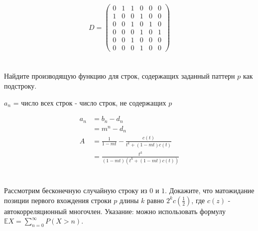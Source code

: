 \[D = \begin{pmatrix}
        0 & 1 & 1 & 0 & 0 & 0 \\
        1 & 0 & 0 & 1 & 0 & 0 \\
        0 & 0 & 1 & 0 & 1 & 0 \\
        0 & 0 & 0 & 1 & 0 & 1 \\
        0 & 0 & 1 & 0 & 0 & 0 \\
        0 & 0 & 0 & 1 & 0 & 0
    \end{pmatrix}\]

\section{}
Найдите производящую функцию для строк, содержащих заданный паттерн $p$ как подстроку.

\(a_n\) = число всех строк - число строк, не содержащих \(p\)

\begin{align*}
    a_n & = b_n - d_n                                          \\
        & = m^n - d_n                                          \\
    A   & = \frac{1}{1 - mt} - \frac{c(t)}{t^k + (1 - mt)c(t)} \\
        & = \frac{t^k}{(1 - mt)(t^k + (1 - mt)c(t))}
\end{align*}

\section{}
Рассмотрим бесконечную случайную строку из $0$ и $1$. Докажите, что матожидание позиции первого вхождения строки $p$ длины $k$ равно $2^k c(\frac 12)$, где $c(z)$ - автокорреляционный многочлен. Указание: можно использовать формулу $\mathbb E X = \sum\limits_{n=0}^{\infty} P(X > n)$.

